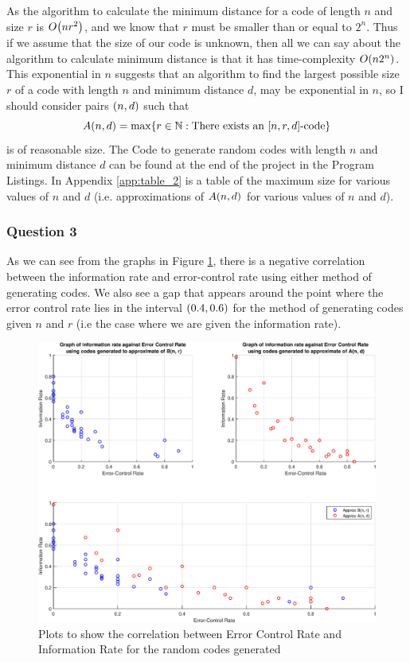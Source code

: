 \documentclass[11pt]{article} %
\let\originalleft\left
\let\originalright\right
\renewcommand{\left}{\mathopen{}\mathclose\bgroup\originalleft}
\renewcommand{\right}{\aftergroup\egroup\originalright}
\begin{document}
As the algorithm to calculate the minimum distance for a code of length $n$ and size $r$ is $O\left(nr^2\right)$, and we know that $r$ must be smaller than  or equal to $2^n$. Thus if we assume that the size of our code is unknown, then all we can say about the algorithm to calculate minimum distance is that it has time-complexity $O\left(n 2^n\right)$. This exponential in $n$ suggests that an algorithm to find the largest possible size $r$ of a code with length $n$ and minimum distance $d$, may be exponential in $n$, so I should consider pairs $\left(n, d\right)$ such that 
\begin{equation*}
	A\left(n, d\right) = \max\left\{r \in \mathbb{N} : \text{There exists an } \left[n, r, d\right] \text{-code} \right\}
\end{equation*}
is of reasonable size.
The Code to generate random codes with length $n$ and minimum distance $d$ can be found at the end of the project in the Program Listings. In Appendix \ref{app:table_2} is a table of the maximum size for various values of $n$ and $d$ (i.e. approximations of $A\left(n, d\right)$ for various values of $n$ and $d$).

\subsubsection*{Question 3}

As we can see from the graphs in Figure \ref{fig:1}, there is a negative correlation between the information rate and error-control rate using either method of generating codes. We also see a gap that appears around the point where the error control rate lies in the interval $\left(0.4, 0.6\right)$ for the method of generating codes given $n$ and $r$ (i.e the case where we are given the information rate).

\begin{figure}[h]
	\centering
	\includegraphics[scale=0.6]{"../MatLab File/Q3 graph"}
	\caption{Plots to show the correlation between Error Control Rate and Information Rate for the random codes generated}
	\label{fig:1}
\end{figure}
\end{document}
